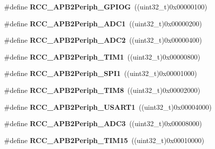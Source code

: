 \begin{DoxyCompactItemize}
\item 
\hypertarget{group__APB2__peripheral_gaba82756d2060b97c62eb555242361b2e}{
\#define {\bfseries RCC\_\-APB2Periph\_\-GPIOG}~((uint32\_\-t)0x00000100)}
\label{group__APB2__peripheral_gaba82756d2060b97c62eb555242361b2e}

\item 
\hypertarget{group__APB2__peripheral_gacd24acb2cd5ca208652157f6c13d3145}{
\#define {\bfseries RCC\_\-APB2Periph\_\-ADC1}~((uint32\_\-t)0x00000200)}
\label{group__APB2__peripheral_gacd24acb2cd5ca208652157f6c13d3145}

\item 
\hypertarget{group__APB2__peripheral_ga4fd76e573e827702568d6064e33448b5}{
\#define {\bfseries RCC\_\-APB2Periph\_\-ADC2}~((uint32\_\-t)0x00000400)}
\label{group__APB2__peripheral_ga4fd76e573e827702568d6064e33448b5}

\item 
\hypertarget{group__APB2__peripheral_ga0d9babf212897db0b3aa852f8a71160b}{
\#define {\bfseries RCC\_\-APB2Periph\_\-TIM1}~((uint32\_\-t)0x00000800)}
\label{group__APB2__peripheral_ga0d9babf212897db0b3aa852f8a71160b}

\item 
\hypertarget{group__APB2__peripheral_ga289cc086580f4b6a080ea0ed3dd4a7af}{
\#define {\bfseries RCC\_\-APB2Periph\_\-SPI1}~((uint32\_\-t)0x00001000)}
\label{group__APB2__peripheral_ga289cc086580f4b6a080ea0ed3dd4a7af}

\item 
\hypertarget{group__APB2__peripheral_gac951d41a08140a7d38a4faff8dd1e03e}{
\#define {\bfseries RCC\_\-APB2Periph\_\-TIM8}~((uint32\_\-t)0x00002000)}
\label{group__APB2__peripheral_gac951d41a08140a7d38a4faff8dd1e03e}

\item 
\hypertarget{group__APB2__peripheral_ga14e1b3b6d84801c223a37a954b5b1910}{
\#define {\bfseries RCC\_\-APB2Periph\_\-USART1}~((uint32\_\-t)0x00004000)}
\label{group__APB2__peripheral_ga14e1b3b6d84801c223a37a954b5b1910}

\item 
\hypertarget{group__APB2__peripheral_ga371d55bbf17bf965a213c59f2d276d72}{
\#define {\bfseries RCC\_\-APB2Periph\_\-ADC3}~((uint32\_\-t)0x00008000)}
\label{group__APB2__peripheral_ga371d55bbf17bf965a213c59f2d276d72}

\item 
\hypertarget{group__APB2__peripheral_ga774f9082c3331890c06b9fd9deafe549}{
\#define {\bfseries RCC\_\-APB2Periph\_\-TIM15}~((uint32\_\-t)0x00010000)}
\label{group__APB2__peripheral_ga774f9082c3331890c06b9fd9deafe549}


\end{DoxyCompactItemize}
